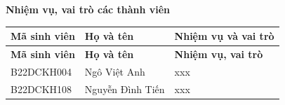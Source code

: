 \documentclass[../BTL.tex]{subfiles}
\begin{document}
\newpage

{}

\begin{center}
    {\textbf{Nhiệm vụ, vai trò các thành viên}}
\end{center}


\begin{longtable}{|>{\centering\arraybackslash}p{3cm}|
                      >{\centering\arraybackslash}p{4cm}|
                      p{7.5cm}|}
\hline
\textbf{Mã sinh viên} & \textbf{Họ và tên} & \textbf{Nhiệm vụ và vai trò} \\
\hline
\endfirsthead

\hline
\textbf{Mã sinh viên} & \textbf{Họ và tên} & \textbf{Nhiệm vụ, vai trò} \\
\hline
\endhead

B22DCKH004 & Ngô Việt Anh & xxx \\
\hline
B22DCKH108 & Nguyễn Đình Tiến &xxx \\
\hline
\end{longtable}
\end{document}
